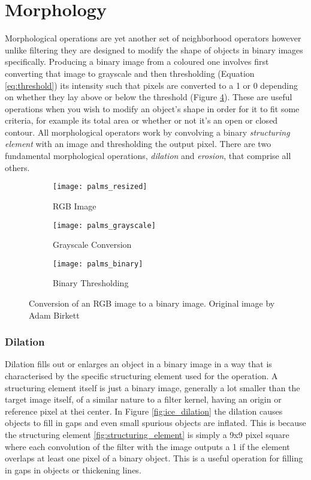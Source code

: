 \section{Morphology}

Morphological operations are yet another set of neighborhood operators however unlike filtering they are designed to modify the shape of objects in binary images specifically. Producing a binary image from a coloured one involves first converting that image to grayscale and then thresholding (Equation \ref{eq:threshold}) its intensity such that pixels are converted to a 1 or 0 depending on whether they lay above or below the threshold (Figure \ref{fig:thresholding}). These are useful operations when you wish to modify an object's shape in order for it to fit some criteria, for example its total area or whether or not it's an open or closed contour. All morphological operators work by convolving a binary \emph{structuring element} with an image and thresholding the output pixel. There are two fundamental morphological operations, \emph{dilation} and \emph{erosion}, that comprise all others. 

\begin{figure}[htbp]
    \centering
    \begin{subfigure}[b]{0.3\textwidth}
        \texttt{[image: palms\_resized]}
        \caption{RGB Image}
        \label{fig:emu_noise}
    \end{subfigure}
    \begin{subfigure}[b]{0.3\textwidth}
        \texttt{[image: palms\_grayscale]}
        \caption{Grayscale Conversion}
        \label{fig:emu_gauss}
    \end{subfigure}
    \begin{subfigure}[b]{0.3\textwidth}
        \texttt{[image: palms\_binary]}
        \caption{Binary Thresholding}
        \label{fig:emu_median}
    \end{subfigure}
    \captionsetup{format = hang}
    \caption{Conversion of an RGB image to a binary image. Original image by Adam Birkett}
    \label{fig:thresholding}
\end{figure}



\subsubsection{Dilation}

Dilation fills out or enlarges an object in a binary image in a way that is characterised by the specific structuring element used for the operation. A structuring element itself is just a binary image, generally a lot smaller than the target image itself, of a similar nature to a filter kernel, having an origin or reference pixel at thei center. In Figure \ref{fig:ice_dilation} the dilation causes objects to fill in gaps and even small spurious objects are inflated. This is because the structuring element \ref{fig:structuring_element} is simply a 9x9 pixel square where each convolution of the filter with the image outputs a 1 if the element overlaps at least one pixel of a binary object. This is a useful operation for filling in gaps in objects or thickening lines.


